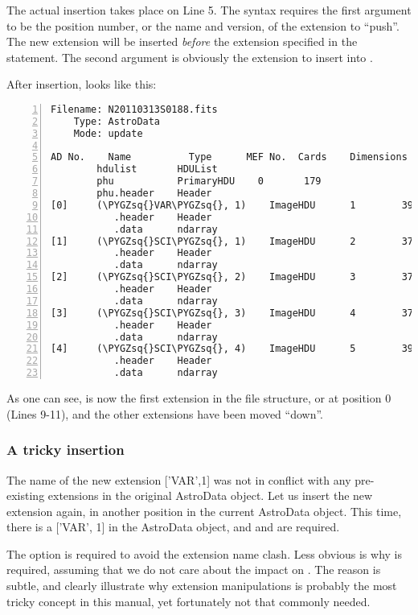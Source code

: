 \documentclass[letterpaper,10pt,english]{sphinxmanual}
\def\PYGZsq{\char`\'}
\begin{document}
The actual insertion takes place on Line 5.  The syntax requires the
first argument to be the position number, or the name and version,
of the extension to ``push''.  The new extension will be inserted \emph{before}
the extension specified in the statement.  The second argument is obviously
the extension to insert into .

After insertion,  looks like this:

\begin{Verbatim}[commandchars=\\\{\},numbers=left,firstnumber=1,stepnumber=1]
Filename: N20110313S0188.fits
    Type: AstroData
    Mode: update

AD No.    Name          Type      MEF No.  Cards    Dimensions   Format
        hdulist       HDUList
        phu           PrimaryHDU    0       179
        phu.header    Header
[0]     (\PYGZsq{}VAR\PYGZsq{}, 1)    ImageHDU      1        39    (2304, 1056)  float32
           .header    Header
           .data      ndarray
[1]     (\PYGZsq{}SCI\PYGZsq{}, 1)    ImageHDU      2        37    (2304, 1056)  float32
           .header    Header
           .data      ndarray
[2]     (\PYGZsq{}SCI\PYGZsq{}, 2)    ImageHDU      3        37    (2304, 1056)  float32
           .header    Header
           .data      ndarray
[3]     (\PYGZsq{}SCI\PYGZsq{}, 3)    ImageHDU      4        37    (2304, 1056)  float32
           .header    Header
           .data      ndarray
[4]     (\PYGZsq{}SCI\PYGZsq{}, 4)    ImageHDU      5        39    (2304, 1056)  float32
           .header    Header
           .data      ndarray
\end{Verbatim}

As one can see,  is now the first extension in the file
structure, or at position 0 (Lines 9-11), and the other extensions have been
moved ``down''.


\subsubsection{A tricky insertion}
\label{io:a-tricky-insertion}
The name of the new extension {[}'VAR',1{]} was not in conflict with any
pre-existing extensions in the original AstroData object.  Let us insert
the new extension again, in another position in the current AstroData object.
This time, there is a {[}'VAR', 1{]} in the AstroData object, and 
and  are required.

The  option is required to avoid the extension name clash.
Less obvious is why  is required, assuming that we do not
care about the impact on .  The reason is subtle, and clearly
illustrate why extension manipulations is probably the most tricky concept
in this manual, yet fortunately not that commonly needed.
\end{document}
